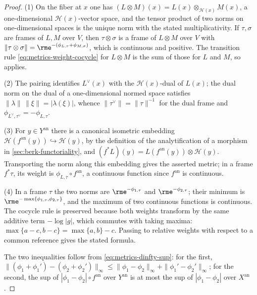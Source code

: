 \begin{proof}
(1) On the fiber at $x$ one has
$(L\otimes M)(x)=L(x)\otimes_{\mathcal H(x)}M(x)$, a one-dimensional
$\mathcal H(x)$-vector space, and the tensor product of two norms on
one-dimensional spaces is the unique norm with the stated multiplicativity.
If $\tau,\sigma$ are frames of $L,M$ over $V$, then
$\tau\otimes\sigma$ is a frame of $L\otimes M$ over $V$ with
$\|\tau\otimes\sigma\|=\rme^{-(\phi_{L,\tau}+\phi_{M,\sigma})}$, which is
continuous and positive. The transition rule
\eqref{eq:metrics-weight-cocycle} for $L\otimes M$ is the sum of those for
$L$ and $M$, so  applies.

(2) The pairing identifies $L^\vee(x)$ with the $\mathcal H(x)$-dual of
$L(x)$; the dual norm on the dual of a one-dimensional normed space
satisfies $\|\lambda\|\,\|\xi\|=|\lambda(\xi)|$, whence
$\|\tau^\vee\|=\|\tau\|^{-1}$ for the dual frame and
$\phi_{L^\vee,\tau^\vee}=-\phi_{L,\tau}$.

(3) For $y\in Y^{\mathrm{an}}$ there is a canonical isometric embedding
$\mathcal H(f^{\mathrm{an}}(y))\hookrightarrow\mathcal H(y)$, by the
definition of the analytification of a morphism in
\cref{sec:berk-functoriality}, and
$(f^*L)(y)=L(f^{\mathrm{an}}(y))\otimes\mathcal H(y)$. Transporting the
norm along this embedding gives the asserted metric; in a frame
$f^*\tau$, its weight is $\phi_{L,\tau}\circ f^{\mathrm{an}}$, a
continuous function since $f^{\mathrm{an}}$ is continuous.

(4) In a frame $\tau$ the two norms are $\rme^{-\phi_{1,\tau}}$ and
$\rme^{-\phi_{2,\tau}}$; their minimum is
$\rme^{-\max\{\phi_{1,\tau},\phi_{2,\tau}\}}$, and the maximum of two
continuous functions is continuous. The cocycle rule is preserved because
both weights transform by the same additive term $-\log|g|$, which
commutes with taking maxima:
$\max\{a-c,b-c\}=\max\{a,b\}-c$. Passing to relative weights with respect
to a common reference gives the stated formula.

The two inequalities follow from \eqref{eq:metrics-dinfty-sup}: for the
first, $\|(\phi_1+\phi_1')-(\phi_2+\phi_2')\|_\infty\le
\|\phi_1-\phi_2\|_\infty+\|\phi_1'-\phi_2'\|_\infty$; for the second, the
sup of $|\phi_1-\phi_2|\circ f^{\mathrm{an}}$ over $Y^{\mathrm{an}}$ is
at most the sup of $|\phi_1-\phi_2|$ over $X^{\mathrm{an}}$.
\end{proof}

